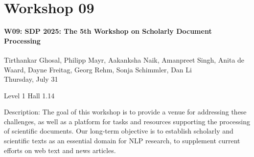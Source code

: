 \clearpage


\section[W09: SDP 2025: The 5th Workshop \\
on Scholarly Document Processing]{Workshop 09}
\label{workshop_9}

\begin{center}
    {\Large \textbf{W09: SDP 2025: The 5th Workshop on Scholarly Document Processing}}\\
\\

    Tirthankar Ghosal, Philipp Mayr, Aakanksha Naik, Amanpreet Singh, Anita de Waard, Dayne Freitag, Georg Rehm, Sonja Schimmler, Dan Li\\

    Thursday, July 31
    
    Level 1 Hall 1.14

\end{center}

Description: The goal of this workshop is to provide a venue for addressing these challenges, as well as a platform for tasks and resources supporting the processing of scientific documents. Our long-term objective is to establish scholarly and scientific texts as an essential domain for NLP research, to supplement current efforts on web text and news articles.

